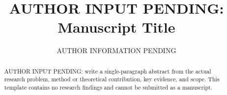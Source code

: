 \documentclass[letterpaper]{article}
\title{AUTHOR INPUT PENDING: Manuscript Title}\author{AUTHOR INFORMATION PENDING}\affiliations{AUTHOR INFORMATION PENDING}
\begin{document}
\maketitle
\begin{abstract}
AUTHOR INPUT PENDING: write a single-paragraph abstract from the actual research problem,
method or theoretical contribution, key evidence, and scope. This template contains
no research findings and cannot be submitted as a manuscript.
\end{abstract}


\clearpage

\end{document}
